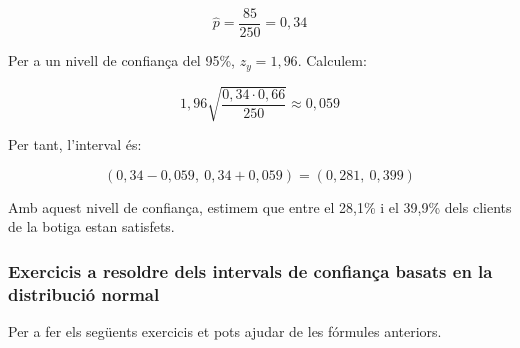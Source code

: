 $$\hat{p}=\frac{85}{250}=0{,}34$$

Per a un nivell de confiança del 95\%, $z_y=1{,}96$. Calculem:

$$1{,}96\sqrt{\frac{0{,}34\cdot0{,}66}{250}}\approx0{,}059$$

Per tant, l'interval és:

$$(0{,}34-0{,}059,\ 0{,}34+0{,}059) = (0{,}281,\ 0{,}399)$$

Amb aquest nivell de confiança, estimem que entre el 28,1\% i el 39,9\% dels clients de la botiga estan satisfets.

\subsubsection{Exercicis a resoldre dels intervals de confiança basats en la distribució normal}
Per a fer els següents exercicis et pots ajudar de les fórmules anteriors.

